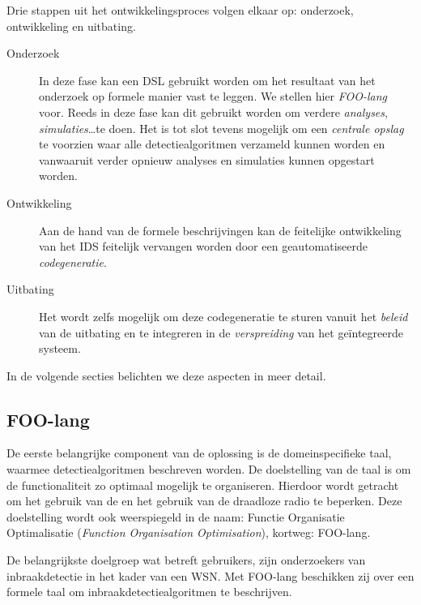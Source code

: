 Drie stappen uit het ontwikkelingsproces volgen elkaar op: onderzoek,
ontwikkeling en uitbating.

\begin{description}

    \item[Onderzoek] In deze fase kan een DSL gebruikt worden om het resultaat
    van het onderzoek op formele manier vast te leggen. We stellen hier
    \emph{FOO-lang} voor. Reeds in deze fase kan dit gebruikt worden om verdere
    \emph{analyses}, \emph{simulaties}\dots te doen. Het is tot slot tevens
    mogelijk om een \emph{centrale opslag} te voorzien waar alle
    detectiealgoritmen verzameld kunnen worden en vanwaaruit verder opnieuw
    analyses en simulaties kunnen opgestart worden.
    
    \item[Ontwikkeling] Aan de hand van de formele beschrijvingen kan de
    feitelijke ontwikkeling van het IDS feitelijk vervangen worden door een
    geautomatiseerde \emph{codegeneratie}.
    
    \item[Uitbating] Het wordt zelfs mogelijk om deze codegeneratie te sturen
    vanuit het \emph{beleid} van de uitbating en te integreren in de
    \emph{verspreiding} van het ge\"integreerde systeem.
    
\end{description}

\noindent In de volgende secties belichten we deze aspecten in meer detail.

\subsection{FOO-lang}
\label{subsection:arch-foo-lang}

De eerste belangrijke component van de oplossing is de domeinspecifieke taal,
waarmee detectiealgoritmen beschreven worden. De doelstelling van de taal is om
de functionaliteit zo optimaal mogelijk te organiseren. Hierdoor wordt getracht
om het gebruik van de \mcu en het gebruik van de draadloze radio te beperken.
Deze doelstelling wordt ook weerspiegeld in de naam: Functie Organisatie
Optimalisatie (\emph{Function Organisation Optimisation}), kortweg: FOO-lang.

De belangrijkste doelgroep wat betreft gebruikers, zijn onderzoekers van
inbraakdetectie in het kader van een WSN. Met FOO-lang beschikken zij over een
formele taal om inbraakdetectiealgoritmen te beschrijven.

